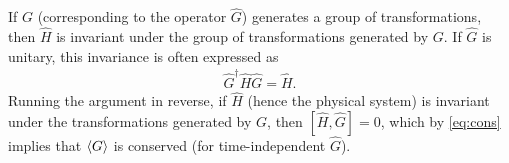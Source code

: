     If $G$ (corresponding to the operator $\hat{G}$) generates a group of transformations, then $\hat{H}$ is invariant under the group of transformations generated by $G$. If $\hat{G}$ is unitary, this invariance is often expressed as 
    \begin{align*}
        \hat{G}^\dagger\hat{H}\hat{G} = \hat{H}.
    \end{align*}
    Running the argument in reverse, if $\hat{H}$ (hence the physical system) is invariant under the transformations generated by $G$, then $[\hat{H},\hat{G}]=0$, which by \cref{eq:cons} implies that $\braket{G}$ is conserved (for time-independent $\hat{G}$).

